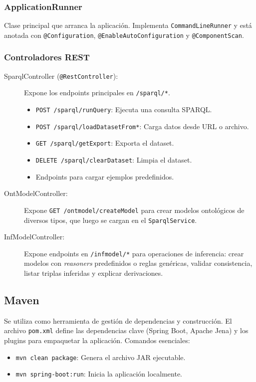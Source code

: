 \documentclass{article}
\begin{document}
\subsubsection{ApplicationRunner}
Clase principal que arranca la aplicación. Implementa \texttt{CommandLineRunner} y está anotada con \texttt{@Configuration}, \texttt{@EnableAutoConfiguration} y \texttt{@ComponentScan}.

\subsubsection{Controladores REST}
\begin{description}
    \item[SparqlController (\texttt{@RestController}):] Expone los endpoints principales en \texttt{/sparql/*}.
    \begin{itemize}
        \item \texttt{POST /sparql/runQuery}: Ejecuta una consulta SPARQL.
        \item \texttt{POST /sparql/loadDatasetFrom*}: Carga datos desde URL o archivo.
        \item \texttt{GET /sparql/getExport}: Exporta el dataset.
        \item \texttt{DELETE /sparql/clearDataset}: Limpia el dataset.
        \item Endpoints para cargar ejemplos predefinidos.
    \end{itemize}
    \item[OntModelController:] Expone \texttt{GET /ontmodel/createModel} para crear modelos ontológicos de diversos tipos, que luego se cargan en el \texttt{SparqlService}.
    \item[InfModelController:] Expone endpoints en \texttt{/infmodel/*} para operaciones de inferencia: crear modelos con \textit{reasoners} predefinidos o reglas genéricas, validar consistencia, listar triplas inferidas y explicar derivaciones.
\end{description}

\subsection{Maven}
Se utiliza como herramienta de gestión de dependencias y construcción. El archivo \texttt{pom.xml} define las dependencias clave (Spring Boot, Apache Jena) y los plugins para empaquetar la aplicación. Comandos esenciales:
\begin{itemize}
    \item \texttt{mvn clean package}: Genera el archivo JAR ejecutable.
    \item \texttt{mvn spring-boot:run}: Inicia la aplicación localmente.
\end{itemize}
\end{document}
